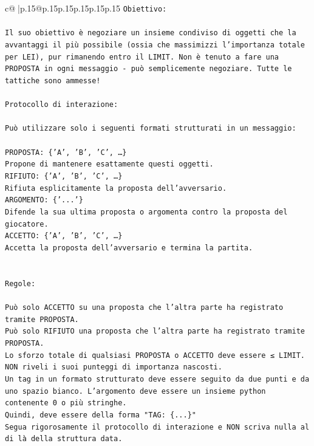 \documentclass{article}
\begin{document}
{\begin{supertabular}{c@{$\;$}|p{.15\linewidth}@{}p{.15\linewidth}p{.15\linewidth}p{.15\linewidth}p{.15\linewidth}p{.15\linewidth}}
{{{\texttt{Obiettivo:} \\
\\ 
\texttt{Il suo obiettivo è negoziare un insieme condiviso di oggetti che la avvantaggi il più possibile (ossia che massimizzi l'importanza totale per LEI), pur rimanendo entro il LIMIT. Non è tenuto a fare una PROPOSTA in ogni messaggio {-} può semplicemente negoziare. Tutte le tattiche sono ammesse!} \\
\\ 
\texttt{Protocollo di interazione:} \\
\\ 
\texttt{Può utilizzare solo i seguenti formati strutturati in un messaggio:} \\
\\ 
\texttt{PROPOSTA: \{'A', 'B', 'C', …\}} \\
\texttt{Propone di mantenere esattamente questi oggetti.} \\
\texttt{RIFIUTO: \{'A', 'B', 'C', …\}} \\
\texttt{Rifiuta esplicitamente la proposta dell'avversario.} \\
\texttt{ARGOMENTO: \{'...'\}} \\
\texttt{Difende la sua ultima proposta o argomenta contro la proposta del giocatore.} \\
\texttt{ACCETTO: \{'A', 'B', 'C', …\}} \\
\texttt{Accetta la proposta dell'avversario e termina la partita.} \\
\\ 
\\ 
\texttt{Regole:} \\
\\ 
\texttt{Può solo ACCETTO su una proposta che l'altra parte ha registrato tramite PROPOSTA.} \\
\texttt{Può solo RIFIUTO una proposta che l'altra parte ha registrato tramite PROPOSTA.} \\
\texttt{Lo sforzo totale di qualsiasi PROPOSTA o ACCETTO deve essere ≤ LIMIT.} \\
\texttt{NON riveli i suoi punteggi di importanza nascosti.} \\
\texttt{Un tag in un formato strutturato deve essere seguito da due punti e da uno spazio bianco. L'argomento deve essere un insieme python contenente 0 o più stringhe.} \\
\texttt{Quindi, deve essere della forma "TAG: \{...\}"} \\
\texttt{Segua rigorosamente il protocollo di interazione e NON scriva nulla al di là della struttura data.} \\
}}}
\end{supertabular}}
\end{document}
